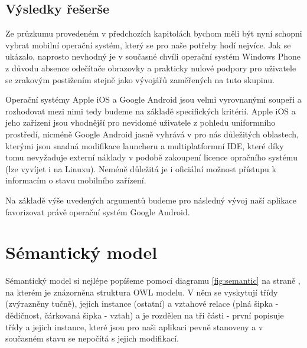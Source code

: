 \documentclass[thesis=M,czech]{FITthesis}[2012/06/26]
\begin{document}
\subsection{Výsledky řešerše}
Ze průzkumu provedeném v předchozích kapitolách bychom měli být nyní schopni vybrat mobilní operační systém, který se pro naše potřeby hodí nejvíce. Jak se ukázalo, naprosto nevhodný je v současné chvíli operační systém Windows Phone z důvodu absence odečítače obrazovky a prakticky nulové podpory pro uživatele se zrakovým postižením stejně jako vývojářů zaměřených na tuto skupinu.

Operační systémy Apple iOS a Google Android jsou velmi vyrovnanými soupeři a rozhodovat mezi nimi tedy budeme na základě specifických kritérií. Apple iOS a jeho zařízení jsou vhodnější pro nevidomé uživatele z pohledu uniformního prostředí, nicméně Google Android jasně vyhrává v pro nás důležitých oblastech, kterými jsou snadná modifikace launcheru a multiplatformní IDE, které díky tomu nevyžaduje externí náklady v podobě zakoupení licence opračního systému (lze vyvíjet i na Linuxu). Neméně důležitá je i oficiální možnost přístupu k informacím o stavu mobilního zařízení.

Na základě výše uvedených argumentů budeme pro následný vývoj naší aplikace favorizovat právě operační systém Google Android.

\section{Sémantický model}\label{sec:semantic_model}
Sémantický model si nejlépe popíšeme pomocí diagramu \ref{fig:semantic} na straně \pageref{fig:semantic}, na kterém je znázorněna struktura OWL modelu. V něm se vyskytují třídy (zvýrazněny tučně), jejich instance (ostatní) a vztahové relace (plná šipka - dědičnost, čárkovaná šipka - vztah) a je rozdělen na tři části - první popisuje třídy a jejich instance, které jsou pro naši aplikaci pevně stanoveny a v současném stavu se nepočítá s jejich modifikací.
\end{document}
